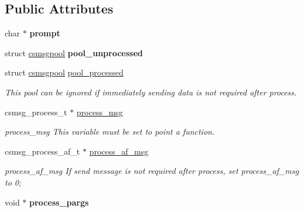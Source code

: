 \subsection*{Public Attributes}
\begin{DoxyCompactItemize}
\item 
\hypertarget{structcsmsgpool__dispatch_a93ea8159cd6de7995c4ad5616cdb2c4b}{}char $\ast$ {\bfseries prompt}\label{structcsmsgpool__dispatch_a93ea8159cd6de7995c4ad5616cdb2c4b}

\item 
\hypertarget{structcsmsgpool__dispatch_a9b02b2e04339a0b32c78a21f8fee8a46}{}struct \hyperlink{structcsmsgpool}{csmsgpool} {\bfseries pool\+\_\+unprocessed}\label{structcsmsgpool__dispatch_a9b02b2e04339a0b32c78a21f8fee8a46}

\item 
struct \hyperlink{structcsmsgpool}{csmsgpool} \hyperlink{structcsmsgpool__dispatch_adcf1e4f0175a47fcfc0283971dbdef57}{pool\+\_\+processed}
\begin{DoxyCompactList}\small\item\em This pool can be ignored if immediately sending data is not required after process. \end{DoxyCompactList}\item 
\hypertarget{structcsmsgpool__dispatch_aefa9098045031a5af9561633c8ff3c10}{}csmsg\+\_\+process\+\_\+t $\ast$ \hyperlink{structcsmsgpool__dispatch_aefa9098045031a5af9561633c8ff3c10}{process\+\_\+msg}\label{structcsmsgpool__dispatch_aefa9098045031a5af9561633c8ff3c10}

\begin{DoxyCompactList}\small\item\em process\+\_\+msg This variable must be set to point a function. \end{DoxyCompactList}\item 
\hypertarget{structcsmsgpool__dispatch_a71e3b4138d0c8952ee6353a1992e26f2}{}csmsg\+\_\+process\+\_\+af\+\_\+t $\ast$ \hyperlink{structcsmsgpool__dispatch_a71e3b4138d0c8952ee6353a1992e26f2}{process\+\_\+af\+\_\+msg}\label{structcsmsgpool__dispatch_a71e3b4138d0c8952ee6353a1992e26f2}

\begin{DoxyCompactList}\small\item\em process\+\_\+af\+\_\+msg If send message is not required after process, set process\+\_\+af\+\_\+msg to 0; \end{DoxyCompactList}\item 
\hypertarget{structcsmsgpool__dispatch_afd343a0b051450dd308226f6e2c8f9a7}{}void $\ast$ {\bfseries process\+\_\+pargs}\label{structcsmsgpool__dispatch_afd343a0b051450dd308226f6e2c8f9a7}

\end{DoxyCompactItemize}


